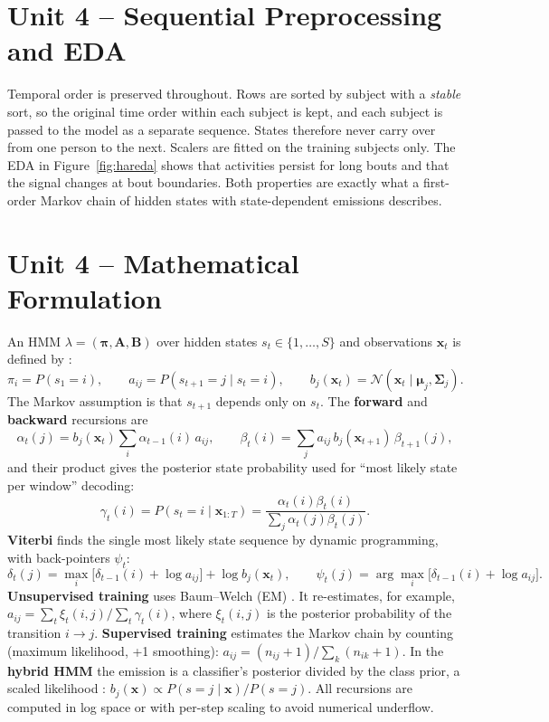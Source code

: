 \section{Unit 4 – Sequential Preprocessing and EDA}
Temporal order is preserved throughout. Rows are sorted by subject with a \emph{stable} sort, so the original time order
within each subject is kept, and each subject is passed to the model as a separate sequence. States therefore never
carry over from one person to the next. Scalers are fitted on the training subjects only. The EDA in
Figure~\ref{fig:hareda} shows that activities persist for long bouts and that the signal changes at bout boundaries.
Both properties are exactly what a first-order Markov chain of hidden states with state-dependent emissions describes.

\section{Unit 4 – Mathematical Formulation}
An HMM $\lambda=(\boldsymbol\pi,\mathbf A,\mathbf B)$ over hidden states $s_t\in\{1,\dots,S\}$ and observations
$\mathbf x_t$ is defined by \cite{rabiner,murphy}:
\begin{equation}
\pi_i=P(s_1=i),\qquad a_{ij}=P(s_{t+1}=j\mid s_t=i),\qquad b_j(\mathbf x_t)=\mathcal N(\mathbf x_t\mid\boldsymbol\mu_j,\boldsymbol\Sigma_j).
\end{equation}
The Markov assumption is that $s_{t+1}$ depends only on $s_t$. The \textbf{forward} and \textbf{backward} recursions are
\begin{equation}
\alpha_t(j)=b_j(\mathbf x_t)\sum_{i}\alpha_{t-1}(i)\,a_{ij},\qquad
\beta_t(i)=\sum_{j}a_{ij}\,b_j(\mathbf x_{t+1})\,\beta_{t+1}(j),
\end{equation}
and their product gives the posterior state probability used for ``most likely state per window'' decoding:
\begin{equation}
\gamma_t(i)=P(s_t=i\mid\mathbf x_{1:T})=\frac{\alpha_t(i)\beta_t(i)}{\sum_j\alpha_t(j)\beta_t(j)} .
\end{equation}
\textbf{Viterbi} \cite{viterbi} finds the single most likely state sequence by dynamic programming, with back-pointers $\psi_t$:
\begin{equation}
\delta_t(j)=\max_i\big[\delta_{t-1}(i)+\log a_{ij}\big]+\log b_j(\mathbf x_t),\qquad
\psi_t(j)=\arg\max_i\big[\delta_{t-1}(i)+\log a_{ij}\big].
\end{equation}
\textbf{Unsupervised training} uses Baum–Welch (EM) \cite{baum}. It re-estimates, for example,
$a_{ij}=\sum_t\xi_t(i,j)/\sum_t\gamma_t(i)$, where $\xi_t(i,j)$ is the posterior probability of the transition
$i\to j$. \textbf{Supervised training} estimates the Markov chain by counting (maximum likelihood, +1 smoothing):
$a_{ij}=(n_{ij}+1)/\sum_k(n_{ik}+1)$. In the \textbf{hybrid HMM} the emission is a classifier's posterior divided by the
class prior, a scaled likelihood \cite{bourlard}: $b_j(\mathbf x)\propto P(s=j\mid\mathbf x)/P(s=j)$. All recursions are computed in log
space or with per-step scaling to avoid numerical underflow.

